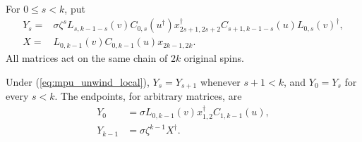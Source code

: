 \begin{definition}
    \label{def:mpu_printed_unwinding_sequence}
    \leanok
    For $0\leq s<k$, put
    \begin{align*}
        Y_s={} & \sigma\zeta^s L_{s,k-1-s}(v)C_{0,s}(u^\dagger)
        x_{2s+1,2s+2}^\dagger C_{s+1,k-1-s}(u)L_{0,s}(v)^\dagger, \\
        X={}   & L_{0,k-1}(v)C_{0,k-1}(u)x_{2k-1,2k}.
    \end{align*}
    All matrices act on the same chain of $2k$ original spins.
\end{definition}

\begin{lemma}
    \label{lem:mpu_printed_sequence_steps}
    \leanok
    Under (\ref{eq:mpu_unwind_local}), $Y_s=Y_{s+1}$ whenever $s+1<k$,
    and $Y_0=Y_s$ for every $s<k$. The endpoints, for arbitrary matrices,
    are
    \begin{align*}
        Y_0     & =\sigma L_{0,k-1}(v)x_{1,2}^\dagger C_{1,k-1}(u), \\
        Y_{k-1} & =\sigma\zeta^{k-1}X^\dagger.
    \end{align*}
\end{lemma}
